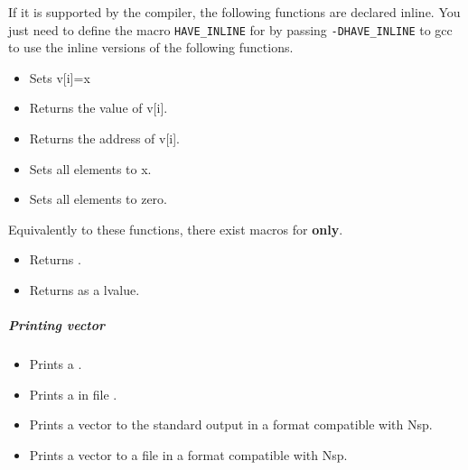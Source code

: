 If it is supported by the compiler, the following functions are declared
inline. You just need to define the macro \verb!HAVE_INLINE! for by passing
\verb!-DHAVE_INLINE! to gcc to use the inline versions of the following
functions.
\begin{itemize}
\item {}
  \sshortdescribe Sets v[i]=x  
\item {}
  \sshortdescribe Returns the value of v[i].  
\item {}
  \sshortdescribe Returns the address of v[i].  
\item {}
  \sshortdescribe Sets all elements to x.  
\item {}
  \sshortdescribe Sets all elements to zero.  
\end{itemize}
Equivalently to these functions, there exist macros for {\bf {} only}.
\begin{itemize}
\item {}
  \sshortdescribe Returns .
  
\item {}
  \sshortdescribe Returns  as a lvalue.
\end{itemize}


\subparagraph{Printing vector}
\begin{itemize}
\item {}
  \sshortdescribe Prints a .  
\item {}
  \sshortdescribe Prints a  in file .  
\item {}
  \sshortdescribe Prints a vector to the standard output in a format
  compatible with Nsp.  

\item {}
  \sshortdescribe Prints a vector to a file in a format compatible with Nsp.
\end{itemize}

